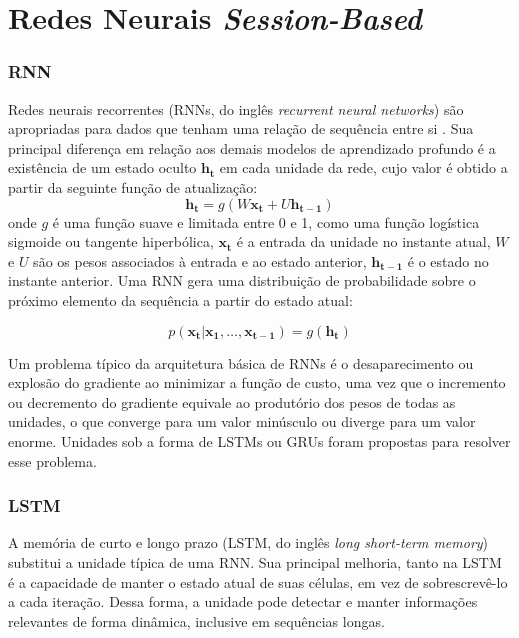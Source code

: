 \section{Redes Neurais \textit{Session-Based}}

\subsubsection{RNN}
Redes neurais recorrentes (RNNs, do inglês \textit{recurrent neural networks})
 são apropriadas para dados que tenham uma relação de sequência entre si
 \cite{gru4rec_1}. Sua principal diferença em relação aos demais modelos de
 aprendizado profundo é a existência de um estado oculto $\mathbf{h_t}$ em
 cada unidade da rede, cujo valor é obtido a partir da seguinte função de
 atualização:
\begin{equation}
    \mathbf{h_t} = g(W\mathbf{x_t} + U\mathbf{h_{t-1}})
\end{equation}
onde $g$ é uma função suave e limitada entre 0 e 1, como uma função logística
sigmoide ou tangente hiperbólica, $\mathbf{x_t}$ é a entrada da unidade no
instante atual, $W$ e $U$ são os pesos associados à entrada e ao estado
anterior, $\mathbf{h_{t-1}}$ é o estado no instante anterior. Uma RNN gera uma
distribuição de probabilidade sobre o próximo elemento da sequência a partir do
estado atual:

\begin{equation}
    p(\mathbf{x_t}|\mathbf{x_1},\ldots , \mathbf{x_{t-1}}) = g(\mathbf{h_t})
\end{equation}

Um problema típico da arquitetura básica de RNNs é o desaparecimento ou explosão
do gradiente ao minimizar a função de custo, uma vez que o incremento ou
decremento do gradiente equivale ao produtório dos pesos de todas as unidades, o
que converge para um valor minúsculo ou diverge para um valor enorme. Unidades
sob a forma de LSTMs ou GRUs foram propostas para resolver esse problema.


\subsubsection{LSTM}
A memória de curto e longo prazo (LSTM, do inglês \textit{long short-term
memory}) \cite{chung2014empirical} substitui a unidade típica de uma RNN. Sua
principal melhoria, tanto na LSTM é a capacidade de manter o estado atual
de suas células, em vez de sobrescrevê-lo a cada iteração. Dessa forma, a
unidade pode detectar e manter informações relevantes de forma dinâmica,
inclusive em sequências longas.

